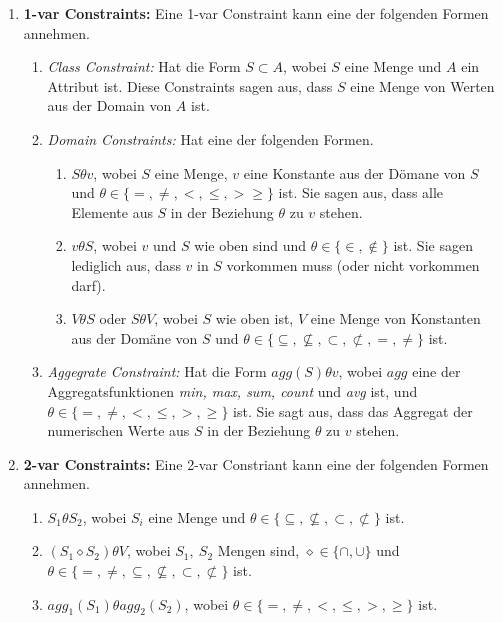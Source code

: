 \begin{enumerate}
\item \textbf{1-var Constraints:} Eine 1-var Constraint kann eine der
folgenden Formen annehmen.
\begin{enumerate}
\item \textit{Class Constraint:} Hat die Form \(S\subset A\), wobei
\(S\) eine Menge und \(A\) ein Attribut ist. Diese Constraints sagen
aus, dass \(S\) eine Menge von Werten aus der Domain von \(A\) ist.
\item \textit{Domain Constraints:} Hat eine der folgenden Formen.
\begin{enumerate}
\item \(S\theta v\), wobei \(S\) eine Menge, \(v\) eine Konstante aus der
Dömane von \(S\) und \(\theta\in\{=,\neq, <,\leq, >\geq\}\) ist.
Sie sagen aus, dass alle Elemente aus \(S\) in der Beziehung \(\theta\)
zu \(v\) stehen.
\item \(v\theta S\), wobei \(v\) und \(S\) wie oben sind und 
\(\theta\in\{\in,\notin\}\) ist. Sie sagen lediglich aus, dass
\(v\) in \(S\) vorkommen muss (oder nicht vorkommen darf).
\item \(V\theta S\) oder \(S\theta V\), wobei \(S\) wie oben ist,
\(V\) eine Menge von Konstanten aus der Domäne von \(S\) und 
\(\theta\in\{\subseteq ,\not\subseteq , \subset ,\not\subset , =,\neq\}\) ist.
\end{enumerate}
\item \textit{Aggegrate Constraint:} Hat die Form \(agg(S)\theta v\),
wobei \(agg\) eine der Aggregatsfunktionen \textit{min, max, sum, count} und
\textit{avg} ist, und \(\theta\in\{=,\neq,<,\leq,>,\geq\}\) ist. Sie sagt aus,
dass das Aggregat der numerischen Werte aus \(S\) in der Beziehung \(\theta\) zu
\(v\) stehen.
\end{enumerate}
\item \textbf{2-var Constraints:} Eine 2-var Constriant kann eine der folgenden
Formen annehmen.
\begin{enumerate}
\item \(S_1\theta S_2\), wobei \(S_i\) eine Menge und \(\theta\in\{\subseteq,
\not\subseteq, \subset,\not\subset\}\) ist.
\item \((S_1\diamond S_2)\theta V\), wobei \(S_1,\ S_2\) Mengen sind, 
\(\diamond\in\{\cap,\cup\}\) und \(\theta\in\{=,\neq ,\subseteq ,\not\subseteq ,\subset ,
\not\subset \}\) ist.
\item \(agg_1(S_1)\theta agg_2(S_2)\), wobei \(\theta\in\{=,\neq ,< ,\leq , > ,\geq\}\)
ist.
\end{enumerate}
\end{enumerate}


